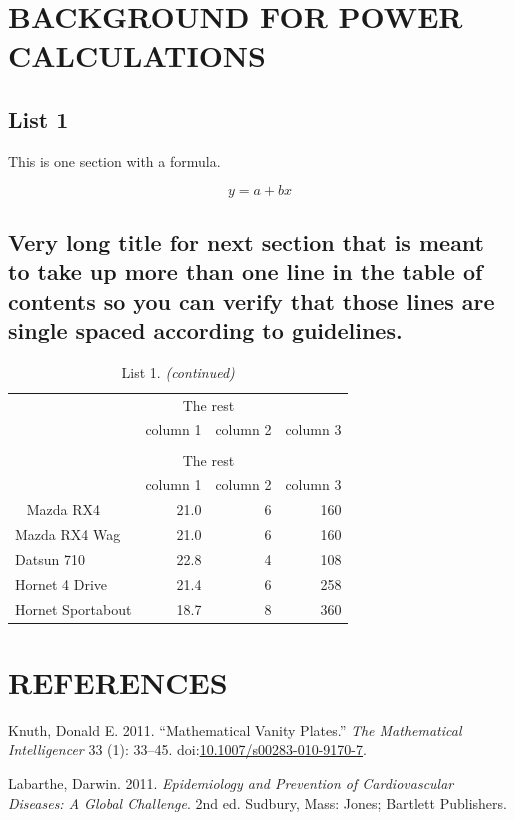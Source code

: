 \documentclass[12pt,report]{uncdissertation}
\begin{document}
\backmatter

\appendix

\chapter{\uppercase{Background for power calculations}}\label{app1}

\section{List 1}

This is one section with a formula.

\[ y = a + bx \]

\singlespace

\section{Very long title for next section that is meant to take up more than one line in the table of contents so you can verify that those lines are single spaced according to guidelines.}

\begin{longtable}[t]{lrrr}
\caption{\label{tab:unnamed-chunk-13}List 1.}\\
\toprule
\multicolumn{1}{c}{ } & \multicolumn{2}{c}{The rest} \\
\cmidrule(l{2pt}r{2pt}){2-3}
  & column 1 & column 2 & column 3\\
\midrule
\endfirsthead
\caption[]{List 1. \textit{(continued)}}\\
\toprule
\multicolumn{1}{c}{ } & \multicolumn{2}{c}{The rest} \\
\cmidrule(l{2pt}r{2pt}){2-3}
  & column 1 & column 2 & column 3\\
\midrule
\endhead
\
\endfoot
\bottomrule
\endlastfoot
Mazda RX4 & 21.0 & 6 & 160\\
Mazda RX4 Wag & 21.0 & 6 & 160\\
Datsun 710 & 22.8 & 4 & 108\\
Hornet 4 Drive & 21.4 & 6 & 258\\
Hornet Sportabout & 18.7 & 8 & 360\\*
\end{longtable}

\chapter*{REFERENCES}

\printbibliography{}

\hypertarget{refs}{}
\hypertarget{ref-knuth_mathematical_2011}{}
Knuth, Donald E. 2011. ``Mathematical Vanity Plates.'' \emph{The
Mathematical Intelligencer} 33 (1): 33--45.
doi:\href{https://doi.org/10.1007/s00283-010-9170-7}{10.1007/s00283-010-9170-7}.

\hypertarget{ref-labarthe_epidemiology_2011}{}
Labarthe, Darwin. 2011. \emph{Epidemiology and Prevention of
Cardiovascular Diseases: A Global Challenge}. 2nd ed. Sudbury, Mass:
Jones; Bartlett Publishers.
\end{document}
